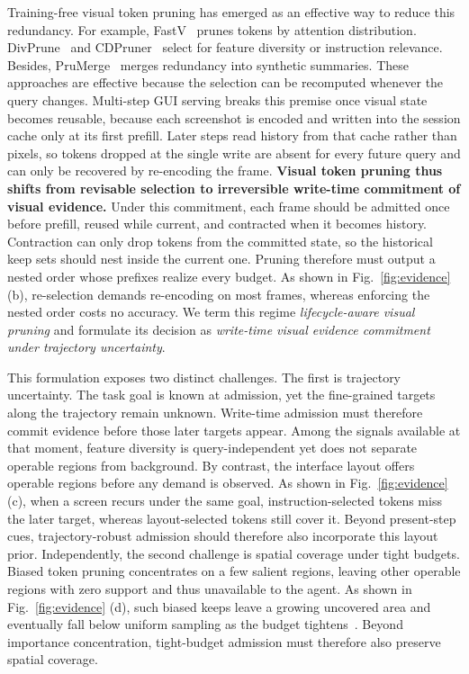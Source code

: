 Training-free visual token pruning has emerged as an effective way to reduce this redundancy.
%
For example, FastV~\citep{chen2024fastv} prunes tokens by attention distribution.
%
DivPrune~\citep{alvar2025divprune} and CDPruner~\citep{zhang2025cdpruner} select for feature diversity or instruction relevance.
%
Besides, PruMerge~\citep{shang2025prumerge} merges redundancy into synthetic summaries.
%
These approaches are effective because the selection can be recomputed whenever the query changes.
%
Multi-step GUI serving breaks this premise once visual state becomes reusable, because each screenshot is encoded and written into the session cache only at its first prefill.
%
Later steps read history from that cache rather than pixels, so tokens dropped at the single write are absent for every future query and can only be recovered by re-encoding the frame.
%
\textbf{Visual token pruning thus shifts from revisable selection to irreversible write-time commitment of visual evidence.}
%
Under this commitment, each frame should be admitted once before prefill, reused while current, and contracted when it becomes history.
%
Contraction can only drop tokens from the committed state, so the historical keep sets should nest inside the current one.
%
Pruning therefore must output a nested order whose prefixes realize every budget.
%
As shown in Fig.~\ref{fig:evidence} (b), re-selection demands re-encoding on most frames, whereas enforcing the nested order costs no accuracy.
%
We term this regime \emph{lifecycle-aware visual pruning} and formulate its decision as \emph{write-time visual evidence commitment under trajectory uncertainty}.

This formulation exposes two distinct challenges.
%
The first is trajectory uncertainty.
%
The task goal is known at admission, yet the fine-grained targets along the trajectory remain unknown.
%
Write-time admission must therefore commit evidence before those later targets appear.
%
Among the signals available at that moment, feature diversity is query-independent yet does not separate operable regions from background.
%
By contrast, the interface layout offers operable regions before any demand is observed.
%
As shown in Fig.~\ref{fig:evidence} (c), when a screen recurs under the same goal, instruction-selected tokens miss the later target, whereas layout-selected tokens still cover it.
%
Beyond present-step cues, trajectory-robust admission should therefore also incorporate this layout prior.
%
Independently, the second challenge is spatial coverage under tight budgets.
%
Biased token pruning concentrates on a few salient regions, leaving other operable regions with zero support and thus unavailable to the agent.
%
As shown in Fig.~\ref{fig:evidence} (d), such biased keeps leave a growing uncovered area and eventually fall below uniform sampling as the budget tightens~\citep{deng2025scope,xu2026score}.
%
Beyond importance concentration, tight-budget admission must therefore also preserve spatial coverage.

